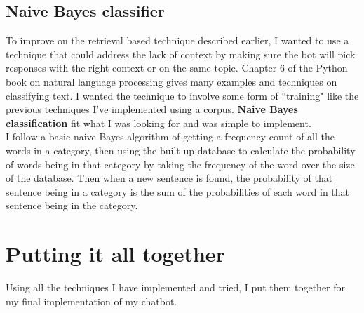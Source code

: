 \documentclass{article}
\newcommand{\n}[0]{\\[\baselineskip]}
\begin{document}
\subsection{Naive Bayes classifier}
To improve on the retrieval based technique described earlier, I wanted to use a technique that could address the lack of context by making sure the bot will pick responses with the right context or on the same topic. Chapter 6 of the Python book on natural language processing \cite{nltk} gives many examples and techniques on classifying text. I wanted the technique to involve some form of ``training" like the previous techniques I've implemented using a corpus. \textbf{Naive Bayes classification} fit what I was looking for and was simple to implement.
\n
I follow a basic naive Bayes algorithm of getting a frequency count of all the words in a category, then using the built up database to calculate the probability of words being in that category by taking the frequency of the word over the size of the database. Then when a new sentence is found, the probability of that sentence being in a category is the sum of the probabilities of each word in that sentence being in the category. 

\section{Putting it all together}
Using all the techniques I have implemented and tried, I put them together for my final implementation of my chatbot. 
\end{document}
